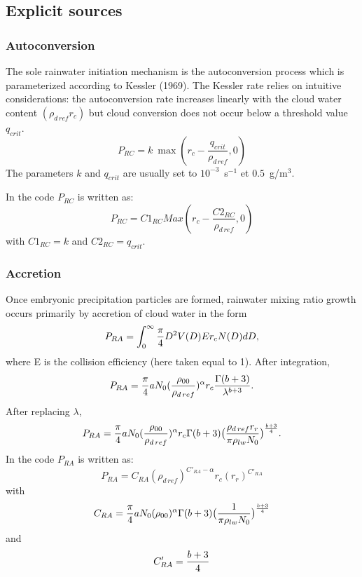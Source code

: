 \subsection{Explicit sources}

\subsubsection{Autoconversion}
The sole rainwater initiation mechanism is the autoconversion process which is
parameterized according to Kessler (1969).
The Kessler rate relies on intuitive considerations:
the autoconversion rate increases linearly with the cloud water content
$(\rho_{d\,ref} r_c)$ but
cloud conversion does not occur below a threshold value $ q_{crit}$.
\begin{equation}
P_{RC}= k\  \max( r_c - \dfrac{q_{crit}}{\rho_{d\,ref}}, 0)
\end{equation}
The parameters $k$ and $q_{crit}$ are
usually set to $10^{-3}$~s$^{-1}$ et $0.5$~g/m$^3$.

In the code $P_{RC}$ is written as:
\begin{equation}
P_{RC}= C1_{RC} Max ( r_c - \dfrac{C2_{RC}}{\rho_{d\,ref}}, 0)
\end{equation}
with $C1_{RC}= k$ and $C2_{RC}=q_{crit}$.


\subsubsection{Accretion}
Once embryonic precipitation particles are formed, rainwater mixing ratio
growth occurs
primarily by accretion of cloud water in the form
\begin{equation}
P_{RA}=\int_0^\infty {\pi \over 4}D^2 V(D) E  r_c N(D)dD,
\end{equation}
where E is the collision efficiency (here taken equal to 1).
After integration,
\begin{equation}
P_{RA}={\pi \over 4}a N_0( \dfrac{ \rho_{00}}{ \rho_{d\,ref}})^{\alpha}
 r_c{\Gamma(b+3) \over \lambda ^{b+3}}.
\end{equation}
After replacing $\lambda$,
\begin{equation}
P_{RA}={\pi \over 4}a N_0( \dfrac{ \rho_{00}}{ \rho_{d\,ref}})^{\alpha}
 r_c  \Gamma(b+3) \big( {\rho_{d\,ref} r_r \over \pi \rho_{lw} N_0}\big)
^{b+3 \over 4}.
\end{equation}
In the code $P_{RA}$ is written as:
\begin{equation}
P_{RA}= C_{RA}( \rho_{d\,ref})^{C'_{RA}-\alpha}  r_c ( r_r )^{C'_{RA}}
\end{equation}
with
$$ C_{RA}={\pi \over 4}a N_0( \rho_{00})^{\alpha} \Gamma(b+3)
\big( {1 \over \pi \rho_{lw} N_0}\big)
^{b+3 \over 4}$$
and $$C'_{RA}={b+3 \over 4}$$

